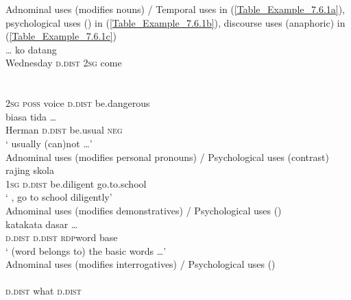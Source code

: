 {\ea
\label{Table_Example_7.6.1} Adnominal uses (modifies nouns) / Temporal uses in (\ref{Table_Example_7.6.1a}), psychological uses () in (\ref{Table_Example_7.6.1b}), discourse uses (anaphoric) in (\ref{Table_Example_7.6.1c})\\
\ea
\label{Table_Example_7.6.1a}
\gll  {}  {\ldots} {ko} {datang}  \\
Wednesday \textsc{d.dist} { } \textsc{2sg} come   \\
\\
\vspace{5pt}
\ex
\label{Table_Example_7.6.1b}
\gll  {}      \\
 \textsc{2sg} \textsc{poss} voice \textsc{d.dist} be.dangerous \\
\vspace{5pt}
\ex
\label{Table_Example_7.6.1c}
 \gll  {}  {biasa} {tida} {\ldots}  \\
 Herman \textsc{d.dist} be.usual \textsc{neg}  \\
\glt ‘  usually (can)not {\ldots}’\\
\z
\z
\ea
\label{Table_Example_7.6.2} Adnominal uses (modifies personal pronouns) / Psychological uses (contrast)\\
\gll  {}  {rajing} {skola}   \\
 \textsc{1sg} \textsc{d.dist} be.diligent go.to.school \\
\glt ‘ , go to school  diligently’ \\
\z
\ea
\label{Table_Example_7.6.3}
Adnominal uses (modifies demonstratives) / Psychological uses ()\\
\gll  {}  {kata}{\Tilde}{kata} {dasar} {\ldots}  \\
\textsc{d.dist} \textsc{d.dist} \textsc{rdp}{\Tilde}word base   \\
\glt ‘ (word belongs to) the  basic words \ldots’ \\
\z
\ea
\label{Table_Example_7.6.4} Adnominal uses (modifies interrogatives) / Psychological uses ()\\
    \\
 \textsc{d.dist} what \textsc{d.dist}  \\
}
